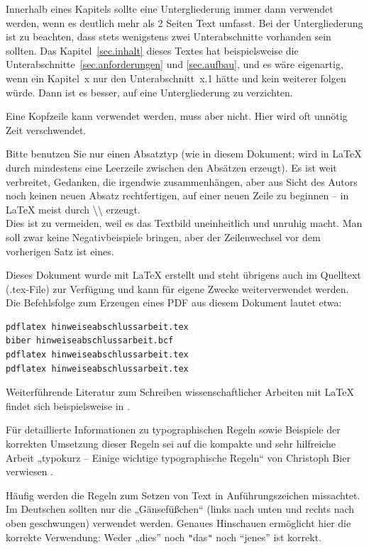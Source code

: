 \documentclass[
    fontsize=12pt,
    headings=small,
    parskip=half,           %
    bibliography=totoc,
    numbers=noenddot,       %
    open=any,               %
    ]{scrreprt}
\begin{document}
Innerhalb eines Kapitels sollte eine Untergliederung immer dann verwendet werden, wenn es deutlich mehr als 2 Seiten Text umfasst. Bei der Untergliederung ist zu beachten, dass stets wenigstens zwei Unterabschnitte vorhanden sein sollten. Das Kapitel~\ref{sec.inhalt} dieses Textes hat beispielsweise die Unterabschnitte~\ref{sec.anforderungen} und \ref{sec.aufbau}, und es wäre eigenartig, wenn ein Kapitel~x nur den Unterabschnitt~x.1 hätte und kein weiterer folgen würde. Dann ist es besser, auf eine Untergliederung zu verzichten.  

Eine Kopfzeile kann verwendet werden, muss aber nicht. Hier wird oft unnötig Zeit verschwendet. 

Bitte benutzen Sie nur einen Absatztyp (wie in diesem Dokument; wird in LaTeX durch mindestens eine Leerzeile zwischen den Absätzen erzeugt). Es ist weit verbreitet, Gedanken, die irgendwie zusammenhängen, aber aus Sicht des Autors noch keinen neuen Absatz rechtfertigen, auf einer neuen Zeile zu beginnen -- in LaTeX meist durch {\textbackslash\textbackslash} erzeugt.\\ Dies ist zu vermeiden, weil es das Textbild uneinheitlich und unruhig macht. Man soll zwar keine Negativbeispiele bringen, aber der Zeilenwechsel vor dem vorherigen Satz ist eines.

Dieses Dokument wurde mit LaTeX erstellt und steht übrigens auch im Quelltext (.tex-File) zur Verfügung und kann für eigene Zwecke weiterverwendet werden. Die Befehlsfolge zum Erzeugen eines PDF aus diesem Dokument lautet etwa:

\begin{lstlisting}[numbers=none,xleftmargin=6pt]
pdflatex hinweiseabschlussarbeit.tex
biber hinweiseabschlussarbeit.bcf
pdflatex hinweiseabschlussarbeit.tex
pdflatex hinweiseabschlussarbeit.tex
\end{lstlisting}

Weiterführende Literatur zum Schreiben wissenschaftlicher Arbeiten mit LaTeX findet sich beispielsweise in \cite{Schl2013}.

Für detaillierte Informationen zu typographischen Regeln sowie Beispiele der korrekten Umsetzung dieser Regeln sei auf die kompakte und sehr hilfreiche Arbeit „typokurz -- Einige wichtige typographische Regeln“ von Christoph Bier verwiesen \cite{Bier2009}.

Häufig werden die Regeln zum Setzen von Text in Anführungszeichen missachtet. Im Deutschen sollten nur die „Gänsefüßchen“ (links nach unten und rechts nach oben geschwungen) verwendet werden. Genaues Hinschauen ermöglicht hier die korrekte Verwendung: Weder „dies” noch {\verb#"#}das{\verb#"#} noch “jenes” ist korrekt.
\end{document}
